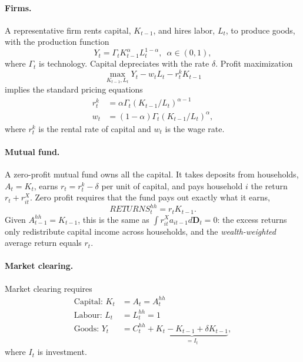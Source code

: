 \documentclass[12pt,english]{article}
\begin{document}
\paragraph*{Firms. }

A representative firm rents capital, $K_{t-1}$, and hires labor, $L_{t}$,
to produce goods, with the production function
\begin{equation}
Y_{t}=\Gamma_{t}K^{\alpha}_{t-1}L^{1-\alpha}_{t},\,\,\,\alpha\in(0,1),\label{eq:Y}
\end{equation}
where $\Gamma_{t}$ is technology. Capital depreciates with the rate
$\delta$. Profit maximization
\[
\max_{K_{t-1},L_{t}}Y_{t}-w_{t}L_{t}-r^{k}_{t}K_{t-1}
\]
implies the standard pricing equations
\begin{align}
r^{k}_{t} & =\alpha\Gamma_{t}(K_{t-1}/L_{t})^{\alpha-1}\label{eq:rk}\\
w_{t} & =(1-\alpha)\Gamma_{t}(K_{t-1}/L_{t})^{\alpha},\label{eq:w}
\end{align}
where $r^{k}_{t}$ is the rental rate of capital and $w_{t}$ is the
wage rate.

\paragraph*{Mutual fund.}

A zero-profit mutual fund owns all the capital. It takes deposits
from households, $A_{t}=K_{t}$, earns $r_{t}=r^{k}_{t}-\delta$ per
unit of capital, and pays household $i$ the return $r_{t}+r^{X}_{it}$.
Zero profit requires that the fund pays out exactly what it earns,
\begin{equation}
RETURNS^{hh}_{t}=r_{t}K_{t-1}.\label{eq:zero_profit}
\end{equation}
Given $A^{hh}_{t-1}=K_{t-1}$, this is the same as $\int r^{X}_{it}a_{it-1}d\boldsymbol{D}_{t}=0$:
the excess returns only redistribute capital income across households,
and the \emph{wealth-weighted} average return equals $r_{t}$.

\paragraph*{Market clearing.}

Market clearing requires
\begin{align}
\text{Capital: }K_{t} & =A_{t}=A^{hh}_{t}\label{eq:clearing_A}\\
\text{Labour: }L_{t} & =L^{hh}_{t}=1\label{eq:clearing_L}\\
\text{Goods: }Y_{t} & =C^{hh}_{t}+\underset{=I_{t}}{\underbrace{K_{t}-K_{t-1}+\delta K_{t-1}}},\label{eq:clearing_Y}
\end{align}
where $I_{t}$ is investment.
\end{document}
